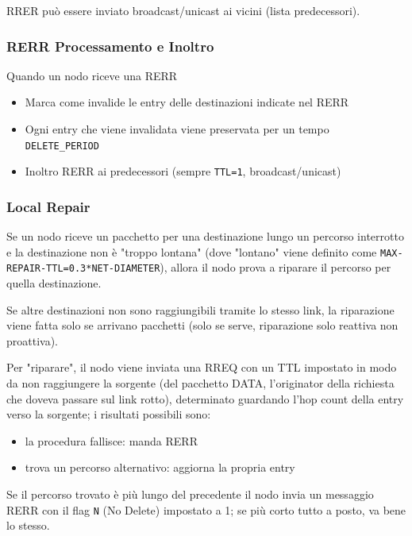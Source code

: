 RRER può essere inviato broadcast/unicast ai vicini (lista predecessori).

\subsubsection{RERR Processamento e Inoltro}

Quando un nodo riceve una RERR
\begin{itemize}
	\item Marca come invalide le entry delle destinazioni indicate nel RERR
	
    \item Ogni entry che viene invalidata viene preservata per un tempo \texttt{DELETE\_PERIOD}
	
    \item Inoltro RERR ai predecessori (sempre \texttt{TTL=1}, broadcast/unicast)
\end{itemize}

\subsubsection{Local Repair}

Se un nodo riceve un pacchetto per una destinazione lungo un percorso interrotto e la destinazione non è "troppo lontana" (dove "lontano" viene definito come \texttt{MAX-REPAIR-TTL=0.3*NET-DIAMETER}), allora il nodo prova a riparare il percorso per quella destinazione.

Se altre destinazioni non sono raggiungibili tramite lo stesso link, la riparazione viene fatta solo se arrivano pacchetti (solo se serve, riparazione solo reattiva non proattiva).

Per "riparare", il nodo viene inviata una RREQ con un TTL impostato in modo da non raggiungere la sorgente (del pacchetto DATA, l'originator della richiesta che doveva passare sul link rotto), determinato guardando l'hop count della entry verso la sorgente; i risultati possibili sono:
\begin{itemize}
	\item la procedura fallisce: manda RERR
	
    \item trova un percorso alternativo: aggiorna la propria entry
\end{itemize}

Se il percorso trovato è più lungo del precedente il nodo invia un messaggio RERR con il flag \texttt{N} (No Delete) impostato a 1; se più corto tutto a posto, va bene lo stesso. 

